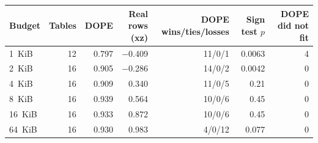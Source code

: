 \begin{tabular}{lrrrrrr}
\toprule
Budget & Tables & DOPE & Real rows (xz) & DOPE wins/ties/losses & Sign test $p$ & DOPE did not fit \\
\midrule
1~KiB & 12 & 0.797 & \ensuremath{-}0.409 & 11/0/1 & 0.0063 & 4 \\
2~KiB & 16 & 0.905 & \ensuremath{-}0.286 & 14/0/2 & 0.0042 & 0 \\
4~KiB & 16 & 0.909 & 0.340 & 11/0/5 & 0.21 & 0 \\
8~KiB & 16 & 0.939 & 0.564 & 10/0/6 & 0.45 & 0 \\
16~KiB & 16 & 0.933 & 0.872 & 10/0/6 & 0.45 & 0 \\
64~KiB & 16 & 0.930 & 0.983 & 4/0/12 & 0.077 & 0 \\
\bottomrule
\end{tabular}
